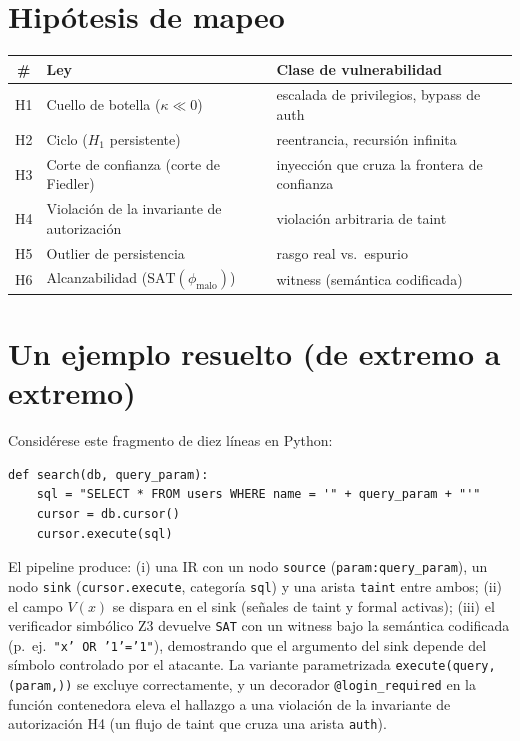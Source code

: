 \documentclass[11pt]{article}
\begin{document}
\section{Hipótesis de mapeo}
\begin{center}
\begin{tabular}{cll}
\toprule
\# & Ley & Clase de vulnerabilidad \\
\midrule
H1 & Cuello de botella ($\kappa \ll 0$) & escalada de privilegios, bypass de auth \\
H2 & Ciclo ($H_1$ persistente) & reentrancia, recursión infinita \\
H3 & Corte de confianza (corte de Fiedler) & inyección que cruza la frontera de confianza \\
H4 & Violación de la invariante de autorización & violación arbitraria de taint \\
H5 & Outlier de persistencia & rasgo real vs.\ espurio \\
H6 & Alcanzabilidad ($\mathrm{SAT}(\phi_{\text{malo}})$) & witness (semántica codificada) \\
\bottomrule
\end{tabular}
\end{center}

\section{Un ejemplo resuelto (de extremo a extremo)}
Considérese este fragmento de diez líneas en Python:
\begin{lstlisting}
def search(db, query_param):
    sql = "SELECT * FROM users WHERE name = '" + query_param + "'"
    cursor = db.cursor()
    cursor.execute(sql)
\end{lstlisting}
El pipeline produce: (i) una IR con un nodo \texttt{source}
(\texttt{param:query\_param}), un nodo \texttt{sink} (\texttt{cursor.execute},
categoría \texttt{sql}) y una arista \texttt{taint} entre ambos; (ii) el campo
$V(x)$ se dispara en el sink (señales de taint y formal activas); (iii) el
verificador simbólico Z3 devuelve \texttt{SAT} con un witness bajo la semántica codificada (p.~ej.\
\texttt{"x' OR '1'='1"}), demostrando que el argumento del sink
depende del símbolo controlado por el atacante. La variante parametrizada
\texttt{execute(query, (param,))} se excluye correctamente, y un decorador
\texttt{@login\_required} en la función contenedora eleva el hallazgo a una
violación de la invariante de autorización H4 (un flujo de taint que cruza una arista
\texttt{auth}).
\end{document}
